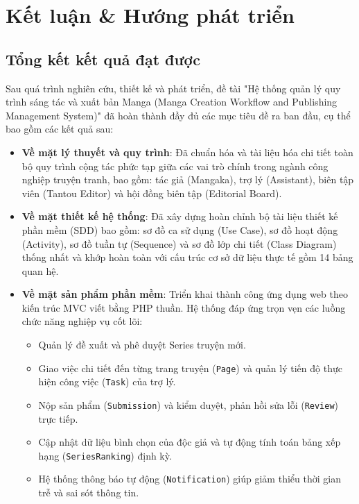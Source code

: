 \chapter{Kết luận \& Hướng phát triển}
\label{ch:ket_luan}

\section{Tổng kết kết quả đạt được}
\label{sec:conclusion_summary}
Sau quá trình nghiên cứu, thiết kế và phát triển, đề tài "Hệ thống quản lý quy trình sáng tác và xuất bản Manga (Manga Creation Workflow and Publishing Management System)" đã hoàn thành đầy đủ các mục tiêu đề ra ban đầu, cụ thể bao gồm các kết quả sau:
\begin{itemize}
    \item \textbf{Về mặt lý thuyết và quy trình}: Đã chuẩn hóa và tài liệu hóa chi tiết toàn bộ quy trình cộng tác phức tạp giữa các vai trò chính trong ngành công nghiệp truyện tranh, bao gồm: tác giả (Mangaka), trợ lý (Assistant), biên tập viên (Tantou Editor) và hội đồng biên tập (Editorial Board).
    \item \textbf{Về mặt thiết kế hệ thống}: Đã xây dựng hoàn chỉnh bộ tài liệu thiết kế phần mềm (SDD) bao gồm: sơ đồ ca sử dụng (Use Case), sơ đồ hoạt động (Activity), sơ đồ tuần tự (Sequence) và sơ đồ lớp chi tiết (Class Diagram) thống nhất và khớp hoàn toàn với cấu trúc cơ sở dữ liệu thực tế gồm 14 bảng quan hệ.
    \item \textbf{Về mặt sản phẩm phần mềm}: Triển khai thành công ứng dụng web theo kiến trúc MVC viết bằng PHP thuần. Hệ thống đáp ứng trọn vẹn các luồng chức năng nghiệp vụ cốt lõi:
    \begin{itemize}
        \item Quản lý đề xuất và phê duyệt Series truyện mới.
        \item Giao việc chi tiết đến từng trang truyện (\texttt{Page}) và quản lý tiến độ thực hiện công việc (\texttt{Task}) của trợ lý.
        \item Nộp sản phẩm (\texttt{Submission}) và kiểm duyệt, phản hồi sửa lỗi (\texttt{Review}) trực tiếp.
        \item Cập nhật dữ liệu bình chọn của độc giả và tự động tính toán bảng xếp hạng (\texttt{SeriesRanking}) định kỳ.
        \item Hệ thống thông báo tự động (\texttt{Notification}) giúp giảm thiểu thời gian trễ và sai sót thông tin.
    \end{itemize}
\end{itemize}

